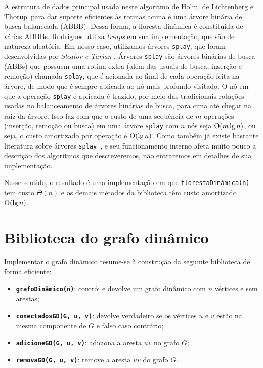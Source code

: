 A estrutura de dados principal usada neste algoritmo de Holm, de Lichtenberg e Thorup~para dar suporte eficientes às rotinas acima é uma árvore binária de busca balanceada (ABBB). Dessa forma, a floresta dinâmica é constituída de várias ABBBs. Rodrigues utiliza \textit{treaps} em sua implementação, que são de natureza aleatória. Em nosso caso, utilizamos árvores \texttt{splay}, que foram desenvolvidas por \textit{Sleator e Tarjan} \cite{sleator}. Árvores \texttt{splay} são árvores binárias de busca (ABBs) que possuem uma rotina extra (além das usuais de busca, inserção e remoção) chamada \texttt{splay}, que é acionada ao final de cada operação feita na árvore, de modo que é sempre aplicada ao nó mais profundo visitado. O nó em que a operação \texttt{splay} é aplicada é trazido, por meio das tradicionais rotações usadas no balanceamento de árvores binárias de busca, para cima até chegar na raiz da árvore. Isso faz com que o custo de uma sequência de $m$ operações (inserção, remoção ou busca) em uma árvore \texttt{splay} com $n$ nós seja $\mathrm{O}(m\lg n)$, ou seja, o custo amortizado por operação é $\mathrm{O}(\lg n)$. Como também já existe bastante literatura sobre árvores \texttt{splay}~\cite[Lecture 12]{kozen}, e seu funcionamento interno afeta muito pouco a descrição dos algoritmos que descreveremos, não entraremos em detalhes de sua implementação.

Nesse sentido, o resultado é uma implementação em que \texttt{florestaDinâmica(n)} tem custo $\Theta(n)$ e os demais métodos da biblioteca têm custo amortizado $\mathrm{O}(\lg n)$.

\section{Biblioteca do grafo dinâmico}
\label{sec:dynamic-graph-structure}

Implementar o grafo dinâmico resume-se à construção da seguinte biblioteca de forma eficiente:

\begin{itemize}
    \item \texttt{\textbf{grafoDinâmico(n)}}: contrói e devolve um grafo dinâmico com $n$ vértices e sem arestas;
    \item \texttt{\textbf{conectadosGD(G, u, v)}}: devolve verdadeiro se os vértices $u$ e $v$ estão na mesma componente de $G$ e falso caso contrário;
    \item \texttt{\textbf{adicioneGD(G, u, v)}}: adiciona a aresta $uv$ no grafo $G$;
    \item \texttt{\textbf{removaGD(G, u, v)}}: remove a aresta $uv$ do grafo $G$.
\end{itemize} 

